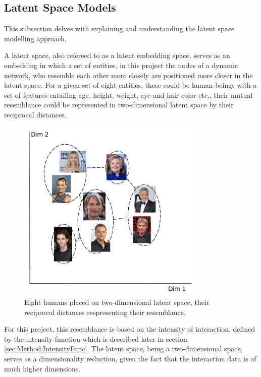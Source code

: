 \subsection{Latent Space Models}
\label{sec:Method:LSM}
This subsection delves with explaining and understanding the latent space modelling approach.

A latent space, also refereed to as a latent embedding space, serves as an embedding in which a set of entities, in this project the nodes of a dynamic network, who resemble each other more closely are positioned more closer in the latent space.
For a given set of eight entities, these could be human beings with a set of features entailing age, height, weight, eye and hair color etc., their mutual resemblance could be represented in two-dimensional latent space by their reciprocal distances.  

\begin{figure}[H]
    \centering
    \includegraphics[width=0.8\textwidth]{0_images/latentSpaceIllustration.png}
    \caption{Eight humans placed on two-dimensional latent space, their reciprocal distances respresenting their resemblance.}
    \label{fig:RLdataset3}
\end{figure}
For this project, this resemblance is based on the intensity of interaction, defined by the intensity function which is described later in section \ref{sec:Method:IntensityFunc}.
The latent space, being a two-dimensional space, serves as a dimensionality reduction, given the fact that the interaction data is of much higher dimensions.

